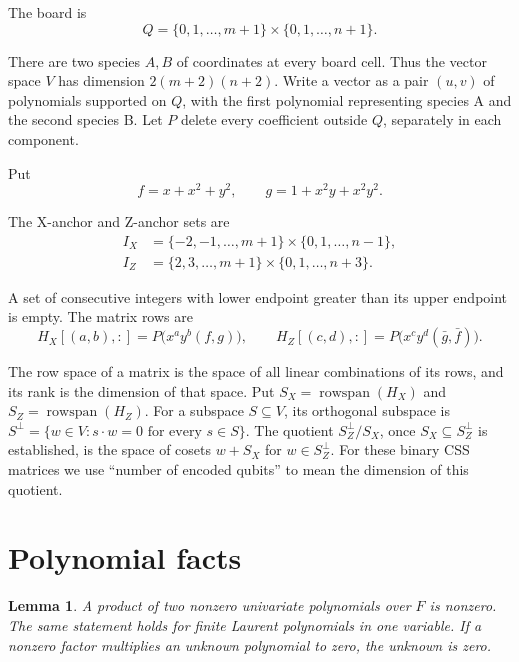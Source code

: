 \documentclass{article}
\newtheorem{lemma}{Lemma}
\begin{document}
The board is
\begin{equation}\label{eq:board}
 Q=\{0,1,\ldots,m+1\}\times\{0,1,\ldots,n+1\}.
\end{equation}

There are two species \(A,B\) of coordinates at every board cell. Thus the vector space
\(V\) has dimension \(2(m+2)(n+2)\). Write a vector as a pair \((u,v)\) of polynomials
supported on \(Q\), with the first polynomial representing species A and the second
species B. Let \(P\) delete every coefficient outside \(Q\), separately in each
component.

Put
\begin{equation}\label{eq:fg}
 f=x+x^2+y^2,\qquad g=1+x^2y+x^2y^2.
\end{equation}

The X-anchor and Z-anchor sets are
\begin{equation}\label{eq:anchors}
\begin{aligned}
 I_X&=\{-2,-1,\ldots,m+1\}\times\{0,1,\ldots,n-1\},\\
 I_Z&=\{2,3,\ldots,m+1\}\times\{0,1,\ldots,n+3\}.
\end{aligned}
\end{equation}

A set of consecutive integers with lower endpoint greater than its upper endpoint
is empty. The matrix rows are
\begin{equation}\label{eq:rows}
 H_X[(a,b),:]=P\bigl(x^ay^b(f,g)\bigr),\qquad
 H_Z[(c,d),:]=P\bigl(x^cy^d(\bar g,\bar f)\bigr).
\end{equation}

The row space of a matrix is the space of all linear combinations of its rows, and
its rank is the dimension of that space. Put \(S_X=\operatorname{rowspan}(H_X)\) and
\(S_Z=\operatorname{rowspan}(H_Z)\). For a subspace \(S\subseteq V\), its orthogonal
subspace is \(S^\perp=\{w\in V : s\cdot w=0\text{ for every }s\in S\}\). The quotient
\(S_Z^\perp/S_X\), once \(S_X\subseteq S_Z^\perp\) is established, is the space of
cosets \(w+S_X\) for \(w\in S_Z^\perp\). For these binary CSS matrices we use
``number of encoded qubits'' to mean the dimension of this quotient.

\section{Polynomial facts}\label{sec:polynomial-facts}

\begin{lemma}\label{lem:domain}
A product of two nonzero univariate polynomials over \(F\) is nonzero.
The same statement holds for finite Laurent polynomials in one variable. If a
nonzero factor multiplies an unknown polynomial to zero, the unknown is zero.
\end{lemma}
\end{document}
